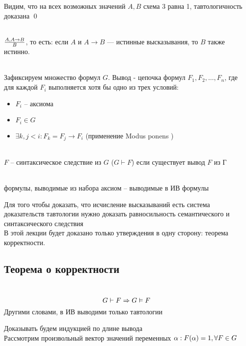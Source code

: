 Видим, что на всех возможных значений $A, B$ схема 3 равна 1, тавтологичность доказана \qed
\begin{definition} \label{def:MP} \\
$\frac{A, A \rightarrow B}{B}$, то есть: если $A$ и $A\to B$ — истинные высказывания, то $B$ также истинно.
\end{definition}
\begin{definition} \\
Зафиксируем множество формул $G$. Вывод - цепочка формул $F_1, F_2, \dots , F_n$, где для каждой $F_i$ выполняется хотя бы одно из трех условий: 
\begin{itemize}
\item $F_i$ -- аксиома
\item $F_i \in G $
\item $\exists k, j < i : F_k = F_j \to F_i$ (применение Modus ponens )
\end{itemize}
\end{definition}
\begin{definition}  \\
$F$ -- синтаксическое следствие из $G$ ($G \vdash F$) если существует вывод $F$ из $Г$
\end{definition}
\begin{definition} \\
формулы, выводимые из набора аксиом -- выводимые в ИВ формулы
\end{definition}
Для того чтобы доказать, что исчисление высказываний есть система доказательств тавтологии нужно доказать равносильность семантического и синтаксического следствия\\
В этой лекции будет доказано только утверждения в одну сторону: теорема корректности.
\subsection{Теорема о корректности} 
\begin{theorem} \label{th:correct} \\
\begin{equation}
G \vdash F \Rightarrow G \vDash F 
\end{equation}
Другими словами, в ИВ выводими только тавтологии
\end{theorem}
\beginproof
Доказывать будем индукцией по длине вывода\\
Рассмотрим произвольный вектор значений переменных $\al: F(\al) \hm{=} 1, \forall F \in G$

